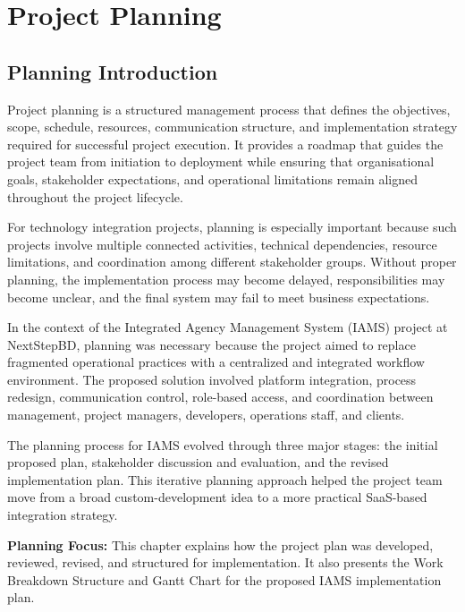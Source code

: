 \documentclass[12pt,a4paper]{report}
\begin{document}
\tableofcontents
\newpage

\chapter{Project Planning}

\section{Planning Introduction}

Project planning is a structured management process that defines the objectives, scope, schedule, resources, communication structure, and implementation strategy required for successful project execution. It provides a roadmap that guides the project team from initiation to deployment while ensuring that organisational goals, stakeholder expectations, and operational limitations remain aligned throughout the project lifecycle.

For technology integration projects, planning is especially important because such projects involve multiple connected activities, technical dependencies, resource limitations, and coordination among different stakeholder groups. Without proper planning, the implementation process may become delayed, responsibilities may become unclear, and the final system may fail to meet business expectations.

In the context of the Integrated Agency Management System (IAMS) project at NextStepBD, planning was necessary because the project aimed to replace fragmented operational practices with a centralized and integrated workflow environment. The proposed solution involved platform integration, process redesign, communication control, role-based access, and coordination between management, project managers, developers, operations staff, and clients.

The planning process for IAMS evolved through three major stages: the initial proposed plan, stakeholder discussion and evaluation, and the revised implementation plan. This iterative planning approach helped the project team move from a broad custom-development idea to a more practical SaaS-based integration strategy.

\begin{highlightBox}
\textbf{Planning Focus:} This chapter explains how the project plan was developed, reviewed, revised, and structured for implementation. It also presents the Work Breakdown Structure and Gantt Chart for the proposed IAMS implementation plan.
\end{highlightBox}
\end{document}
